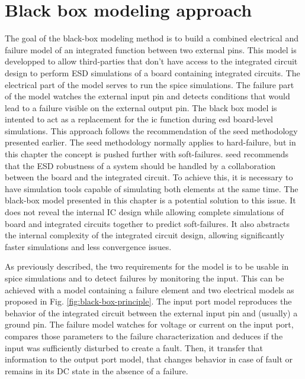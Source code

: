 \section{Black box modeling approach}

The goal of the black-box modeling method is to build a combined electrical and failure model of an integrated function between two external pins.
This model is developped to allow third-parties that don't have access to the integrated circuit design to perform ESD simulations of a board containing integrated circuits.
The electrical part of the model serves to run the \gls{spice} simulations.
The failure part of the model watches the external input pin and detects conditions that would lead to a failure visible on the external output pin.
The black box model is intented to act as a replacement for the \gls{ic} function during \gls{esd} board-level simulations.
This approach follows the recommendation of the \gls{seed} methodology \cite{seed} presented earlier.
The \gls{seed} methodology normally applies to hard-failure, but in this chapter the concept is pushed further with soft-failures.
\gls{seed} recommends that the ESD robustness of a system should be handled by a collaboration between the board and the integrated circuit.
To achieve this, it is necessary to have simulation tools capable of simulating both elements at the same time.
The black-box model presented in this chapter is a potential solution to this issue.
It does not reveal the internal IC design while allowing complete simulations of board and integrated circuits together to predict soft-failures.
It also abstracts the internal complexity of the integrated circuit design, allowing significantly faster simulations and less convergence issues.

As previously described, the two requirements for the model is to be usable in \gls{spice} simulations and to detect failures by monitoring the input.
This can be achieved with a model containing a failure element and two electrical models as proposed in Fig. \ref{fig:black-box-principle}.
The input port model reproduces the behavior of the integrated circuit between the external input pin and (usually) a ground pin.
The failure model watches for voltage or current on the input port, compares those parameters to the failure characterization and deduces if the input was sufficiently disturbed to create a fault.
Then, it transfer that information to the output port model, that changes behavior in case of fault or remains in its DC state in the absence of a failure.


